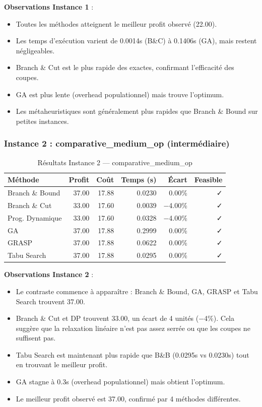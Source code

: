 \documentclass[11pt,a4paper]{article}
\begin{document}
\textbf{Observations Instance 1} :

\begin{itemize}
    \item Toutes les méthodes atteignent le meilleur profit observé (22.00).
    \item Les temps d'exécution varient de 0.0014s (B\&C) à 0.1406s (GA), mais restent négligeables.
    \item Branch \& Cut est le plus rapide des exactes, confirmant l'efficacité des coupes.
    \item GA est plus lente (overhead populationnel) mais trouve l'optimum.
    \item Les métaheuristiques sont généralement plus rapides que Branch \& Bound sur petites instances.
\end{itemize}

\subsubsection*{Instance 2 : comparative\_medium\_op (intermédiaire)}

\begin{table}[H]
\centering
\caption{Résultats Instance 2 — comparative\_medium\_op}
\begin{tabular}{lrrrrr}
\toprule
\textbf{Méthode} & \textbf{Profit} & \textbf{Coût} & \textbf{Temps (s)} & \textbf{Écart} & \textbf{Feasible} \\
\midrule
Branch \& Bound & 37.00 & 17.88 & 0.0230 & 0.00\% & ✓ \\
Branch \& Cut & 33.00 & 17.60 & 0.0039 & −4.00\% & ✓ \\
Prog. Dynamique & 33.00 & 17.60 & 0.0328 & −4.00\% & ✓ \\
GA & 37.00 & 17.88 & 0.2999 & 0.00\% & ✓ \\
GRASP & 37.00 & 17.88 & 0.0622 & 0.00\% & ✓ \\
Tabu Search & 37.00 & 17.88 & 0.0295 & 0.00\% & ✓ \\
\bottomrule
\end{tabular}
\end{table}

\textbf{Observations Instance 2} :

\begin{itemize}
    \item Le contraste commence à apparaître : Branch \& Bound, GA, GRASP et Tabu Search trouvent 37.00.
    \item Branch \& Cut et DP trouvent 33.00, un écart de 4 unités (−4\%). Cela suggère que la relaxation linéaire n'est pas assez serrée ou que les coupes ne suffisent pas.
    \item Tabu Search est maintenant plus rapide que B\&B (0.0295s vs 0.0230s) tout en trouvant le meilleur profit.
    \item GA stagne à 0.3s (overhead populationnel) mais obtient l'optimum.
    \item Le meilleur profit observé est 37.00, confirmé par 4 méthodes différentes.
\end{itemize}
\end{document}
